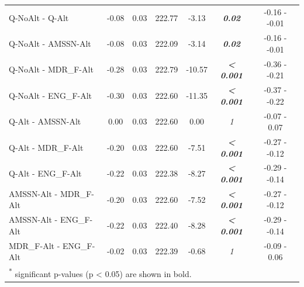 \documentclass[a4paper, twoside]{templates/ociamthesis}
\begin{document}
\begin{table}
{\begin{tabular}[t]{lcccc>{}cc}
\hspace{1em}Q-NoAlt - Q-Alt & -0.08 & 0.03 & 222.77 & -3.13 & \em{\textbf{0.02}} & -0.16 - -0.01\\
\hspace{1em}Q-NoAlt - AMSSN-Alt & -0.08 & 0.03 & 222.09 & -3.14 & \em{\textbf{0.02}} & -0.16 - -0.01\\
\hspace{1em}Q-NoAlt - MDR\_F-Alt & -0.28 & 0.03 & 222.79 & -10.57 & \em{\textbf{< 0.001}} & -0.36 - -0.21\\
\hspace{1em}Q-NoAlt - ENG\_F-Alt & -0.30 & 0.03 & 222.60 & -11.35 & \em{\textbf{< 0.001}} & -0.37 - -0.22\\
\hspace{1em}Q-Alt - AMSSN-Alt & 0.00 & 0.03 & 222.60 & 0.00 & \em{1} & -0.07 - 0.07\\
\hspace{1em}Q-Alt - MDR\_F-Alt & -0.20 & 0.03 & 222.60 & -7.51 & \em{\textbf{< 0.001}} & -0.27 - -0.12\\
\hspace{1em}Q-Alt - ENG\_F-Alt & -0.22 & 0.03 & 222.38 & -8.27 & \em{\textbf{< 0.001}} & -0.29 - -0.14\\
\hspace{1em}AMSSN-Alt - MDR\_F-Alt & -0.20 & 0.03 & 222.60 & -7.52 & \em{\textbf{< 0.001}} & -0.27 - -0.12\\
\hspace{1em}AMSSN-Alt - ENG\_F-Alt & -0.22 & 0.03 & 222.40 & -8.28 & \em{\textbf{< 0.001}} & -0.29 - -0.14\\
\hspace{1em}MDR\_F-Alt - ENG\_F-Alt & -0.02 & 0.03 & 222.39 & -0.68 & \em{1} & -0.09 - 0.06\\
\bottomrule
\multicolumn{7}{l}{\textsuperscript{*} significant p-values (p < 0.05) are shown in bold.}\\
\end{tabular}}
\end{table}
\end{document}
